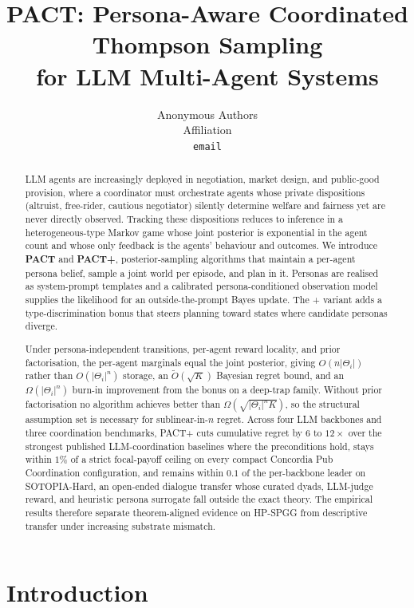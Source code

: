 \documentclass{article}
\title{PACT: Persona-Aware Coordinated Thompson Sampling\\
for LLM Multi-Agent Systems}
\author{Anonymous Authors\\
Affiliation\\
\texttt{email}}
\def\textsuperscript#1{#1}%
\begin{document}
\maketitle

\begin{abstract}
LLM agents are increasingly deployed in negotiation, market design, and public-good provision, where a coordinator must orchestrate agents whose private dispositions (altruist, free-rider, cautious negotiator) silently determine welfare and fairness yet are never directly observed. Tracking these dispositions reduces to inference in a heterogeneous-type Markov game whose joint posterior is exponential in the agent count and whose only feedback is the agents' behaviour and outcomes. We introduce \textbf{PACT} and \textbf{PACT\textsuperscript{+}}, posterior-sampling algorithms that maintain a per-agent persona belief, sample a joint world per episode, and plan in it. Personas are realised as system-prompt templates and a calibrated persona-conditioned observation model supplies the likelihood for an outside-the-prompt Bayes update. The \textsuperscript{+} variant adds a type-discrimination bonus that steers planning toward states where candidate personas diverge.

Under persona-independent transitions, per-agent reward locality, and prior factorisation, the per-agent marginals equal the joint posterior, giving $O(n|\Theta_i|)$ rather than $O(|\Theta_i|^n)$ storage, an $\tilde O(\sqrt K)$ Bayesian regret bound, and an $\Omega(|\Theta_i|^n)$ burn-in improvement from the bonus on a deep-trap family. Without prior factorisation no algorithm achieves better than $\Omega(\sqrt{|\Theta_i|^n K})$, so the structural assumption set is necessary for sublinear-in-$n$ regret. Across four LLM backbones and three coordination benchmarks, PACT\textsuperscript{+} cuts cumulative regret by $6$ to $12\times$ over the strongest published LLM-coordination baselines where the preconditions hold, stays within $1\%$ of a strict focal-payoff ceiling on every compact Concordia Pub Coordination configuration, and remains within $0.1$ of the per-backbone leader on SOTOPIA-Hard, an open-ended dialogue transfer whose curated dyads, LLM-judge reward, and heuristic persona surrogate fall outside the exact theory. The empirical results therefore separate theorem-aligned evidence on HP-SPGG from descriptive transfer under increasing substrate mismatch.
\end{abstract}


\section{Introduction}
\label{sec:intro}
\end{document}
